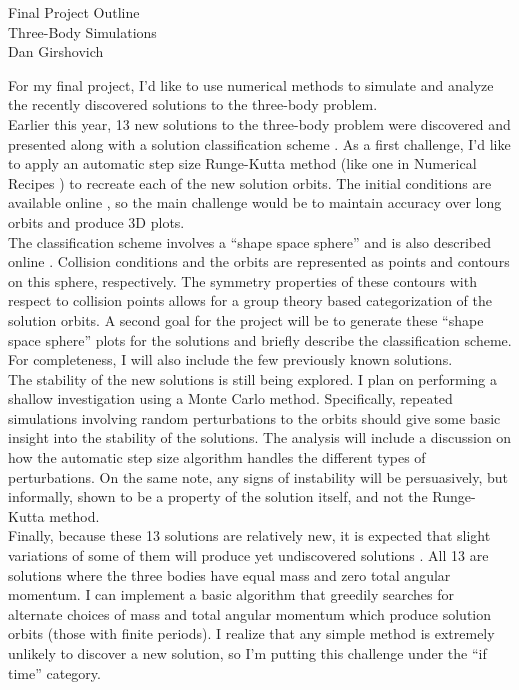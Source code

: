 \documentclass[12pt]{article}
\begin{document}
\begin{center}
Final Project Outline \\
Three-Body Simulations \\
Dan Girshovich
\end{center}

For my final project, I'd like to use numerical methods to simulate and analyze the recently discovered solutions to the three-body problem. \\

Earlier this year, 13 new solutions to the three-body problem were discovered and presented along with a solution classification scheme \cite{suv}. As a first challenge, I'd like to apply an automatic step size Runge-Kutta method (like one in Numerical Recipes \cite{numericalrecipes}) to recreate each of the new solution orbits. The initial conditions are available online \cite{3bsite}, so the main challenge would be to maintain accuracy over long orbits and produce 3D plots. \\

The classification scheme involves a ``shape space sphere'' and is also described online \cite{3bsite}. Collision conditions and the orbits are represented as points and contours on this sphere, respectively. The symmetry properties of these contours with respect to collision points allows for a group theory based categorization of the solution orbits. A second goal for the project will be to generate these ``shape space sphere'' plots for the solutions and briefly describe the classification scheme. For completeness, I will also include the few previously known solutions.\\

The stability of the new solutions is still being explored. I plan on performing a shallow investigation using a Monte Carlo method. Specifically, repeated simulations involving random perturbations to the orbits should give some basic insight into the stability of the solutions. The analysis will include a discussion on how the automatic step size algorithm handles the different types of perturbations. On the same note, any signs of instability will be persuasively, but informally, shown to be a property of the solution itself, and not the Runge-Kutta method.\\

Finally, because these 13 solutions are relatively new, it is expected that slight variations of some of them will produce yet undiscovered solutions \cite{suv}. All 13 are solutions where the three bodies have equal mass and zero total angular momentum. I can implement a basic algorithm that greedily searches for alternate choices of mass and total angular momentum which produce solution orbits (those with finite periods). I realize that any simple method is extremely unlikely to discover a new solution, so I'm putting this challenge under the ``if time'' category.
\end{document}
